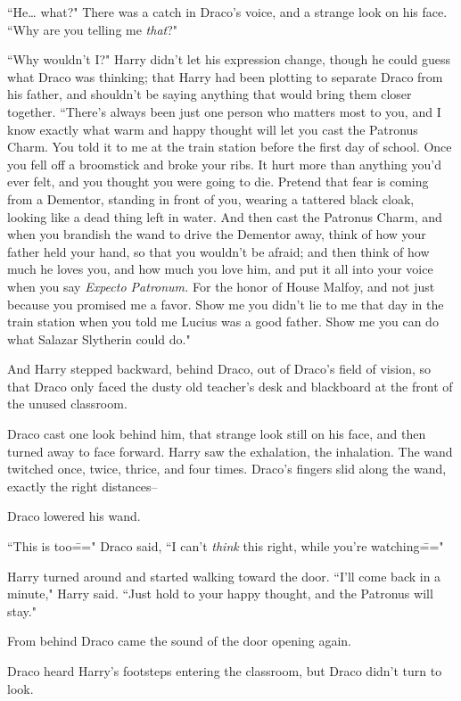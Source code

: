 ``He{\ldots} what?" There was a catch in Draco's voice, and a strange look on his face. ``Why are you telling me \emph{that}?"

``Why wouldn't I?" Harry didn't let his expression change, though he could guess what Draco was thinking; that Harry had been plotting to separate Draco from his father, and shouldn't be saying anything that would bring them closer together. ``There's always been just one person who matters most to you, and I know exactly what warm and happy thought will let you cast the Patronus Charm. You told it to me at the train station before the first day of school. Once you fell off a broomstick and broke your ribs. It hurt more than anything you'd ever felt, and you thought you were going to die. Pretend that fear is coming from a Dementor, standing in front of you, wearing a tattered black cloak, looking like a dead thing left in water. And then cast the Patronus Charm, and when you brandish the wand to drive the Dementor away, think of how your father held your hand, so that you wouldn't be afraid; and then think of how much he loves you, and how much you love him, and put it all into your voice when you say \emph{Expecto Patronum.} For the honor of House Malfoy, and not just because you promised me a favor. Show me you didn't lie to me that day in the train station when you told me Lucius was a good father. Show me you can do what Salazar Slytherin could do."

And Harry stepped backward, behind Draco, out of Draco's field of vision, so that Draco only faced the dusty old teacher's desk and blackboard at the front of the unused classroom.

Draco cast one look behind him, that strange look still on his face, and then turned away to face forward. Harry saw the exhalation, the inhalation. The wand twitched once, twice, thrice, and four times. Draco's fingers slid along the wand, exactly the right distances\---

Draco lowered his wand.

``This is too\===" Draco said, ``I can't \emph{think} this right, while you're watching\==="

Harry turned around and started walking toward the door. ``I'll come back in a minute," Harry said. ``Just hold to your happy thought, and the Patronus will stay."

\later

From behind Draco came the sound of the door opening again.

Draco heard Harry's footsteps entering the classroom, but Draco didn't turn to look.

